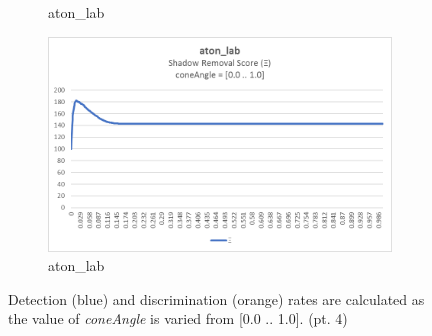 \begin{appendices}
\begin{figure}
\begin{subfigure}{.45\linewidth}
  \caption{aton\_lab}
\end{subfigure}
\hfill
\begin{subfigure}{.45\linewidth}
  \includegraphics[width=1\linewidth]{figures/appendix/lab_coneAngle_score.jpg}
  \caption{aton\_lab}
\end{subfigure}

\caption{Detection (blue) and discrimination (orange) rates are calculated as the value of \textit{coneAngle} is varied from [0.0 .. 1.0]. (pt. 4)}
\end{figure}


\end{appendices}

